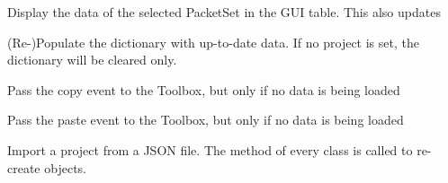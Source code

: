 \documentclass[letterpaper,10pt,english]{sphinxmanual}
\begin{document}
\begin{fulllineitems}
\begin{fulllineitems}
\end{fulllineitems}


\begin{fulllineitems}
\label{\detokenize{src:src.ManagerTab.ManagerTab.getDump}}
Display the data of the selected PacketSet in the GUI table. This also updates 

\end{fulllineitems}


\begin{fulllineitems}
\label{\detokenize{src:src.ManagerTab.ManagerTab.getKnownPacketsForCurrentProject}}
(Re-)Populate the dictionary  with up-to-date data.
If no project is set, the dictionary will be cleared only.

\end{fulllineitems}


\begin{fulllineitems}
\label{\detokenize{src:src.ManagerTab.ManagerTab.handleCopy}}
Pass the copy event to the Toolbox, but only if no data is being loaded

\end{fulllineitems}


\begin{fulllineitems}
\label{\detokenize{src:src.ManagerTab.ManagerTab.handlePaste}}
Pass the paste event to the Toolbox, but only if no data is being loaded

\end{fulllineitems}


\begin{fulllineitems}
\label{\detokenize{src:src.ManagerTab.ManagerTab.importProject}}
Import a project from a JSON file.
The  method of every class is called to re-create objects.


\end{fulllineitems}
\end{fulllineitems}
\end{document}
